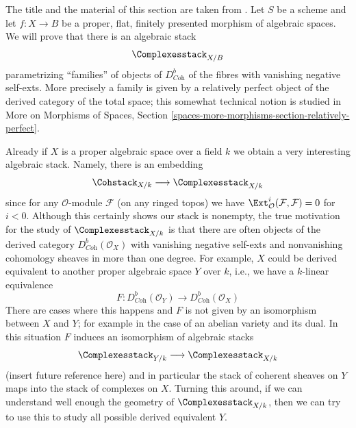 \noindent
The title and the material of this section are taken from
\cite{lieblich-complexes}. Let $S$ be a scheme and let
$f : X \to B$ be a proper, flat, finitely presented morphism
of algebraic spaces. We will prove that there is an
algebraic stack
$$
\Complexesstack_{X/B}
$$
parametrizing ``families'' of objects of $D^b_{\textit{Coh}}$
of the fibres with vanishing negative self-exts. More precisely
a family is given by a relatively perfect object of the derived
category of the total space; this somewhat technical notion
is studied in
More on Morphisms of Spaces, Section
\ref{spaces-more-morphisms-section-relatively-perfect}.

\medskip\noindent
Already if $X$ is a proper algebraic
space over a field $k$ we obtain a very interesting algebraic stack.
Namely, there is an embedding
$$
\Cohstack_{X/k} \longrightarrow \Complexesstack_{X/k}
$$
since for any $\mathcal{O}$-module $\mathcal{F}$ (on any ringed topos)
we have $\Ext^i_\mathcal{O}(\mathcal{F}, \mathcal{F}) = 0$ for $i < 0$.
Although this certainly shows our stack is nonempty, the
true motivation for the study of $\Complexesstack_{X/k}$
is that there are often objects of the derived category
$D^b_{\textit{Coh}}(\mathcal{O}_X)$ with vanishing negative self-exts
and nonvanishing cohomology sheaves in more than one degree.
For example, $X$ could be derived equivalent to another
proper algebraic space $Y$ over $k$, i.e., we have a
$k$-linear equivalence
$$
F : D^b_{\textit{Coh}}(\mathcal{O}_Y)
\longrightarrow
D^b_{\textit{Coh}}(\mathcal{O}_X)
$$
There are cases where this happens and $F$ is not given by
an isomorphism between $X$ and $Y$; for example in the case
of an abelian variety and its dual. In this situation $F$ induces
an isomorphism of algebraic stacks
$$
\Complexesstack_{Y/k}
\longrightarrow
\Complexesstack_{X/k}
$$
(insert future reference here) and in particular the stack of coherent sheaves
on $Y$ maps into the stack of complexes on $X$. Turning this around,
if we can understand well enough the geometry of
$\Complexesstack_{X/k}$, then we can try to use this to study all possible
derived equivalent $Y$.

